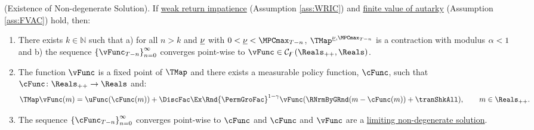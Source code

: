 \documentclass[BufferStockTheory]{subfiles}
\begin{document}
\hypertarget{Sufficient-Conditions-For-non-degenerate-Solution}{}
\begin{theorem}(Existence of Non-degenerate Solution).
\label{thm:convgtobellman}
If \hyperlink{WRIC}{weak return impatience} (Assumption \ref{ass:WRIC}) and \hyperlink{FVAC}{finite value of autarky} (Assumption \ref{ass:FVAC}) hold, then:
%
\begin{enumerate}[label=(\roman*)]
\item There exists $k\in \mathbb{N}$ such that a) for all $n>k$ and $\underline{\nu}$ with $0<\MPCminInf<\MPCmax_{T-n}$, $\TMap^{\MPCminInf, \MPCmax_{T-n}}$ is a contraction with modulus $\alpha<1$ and b) the sequence $\left\{\vFunc_{T-n}\right\}_{n=0}^{\infty}$ converges point-wise to $\vFunc \in \mathcal{C}_{\boundFunc}(\Reals_{++},\Reals)$.
\item The function $\vFunc$ is a fixed point of $\TMap$ and there exists a measurable policy function, $\cFunc$, such that $\cFunc\colon \Reals_{++}\rightarrow \Reals$ and:
\begin{equation}\label{eq:stationarybellman}
\TMap\vFunc(m) =  \uFunc(\cFunc(m)) + \DiscFac\Ex \Rnd{\PermGroFac}^{1-\CRRA}\vFunc(\RNrmByGRnd(m-\cFunc(m)) + \tranShkAll) , \qquad m\in \Reals_{++}. 
\end{equation}
\item  The sequence $\left\{\cFunc_{T-n}\right\}_{n=0}^{\infty}$ converges point-wise to $\cFunc$ and $\cFunc$ and $\vFunc$ are a \hyperlink{Definition-of-a-non-degenerate-Solution}{limiting non-degenerate solution}.
\end{enumerate}
\end{theorem}
\end{document}
